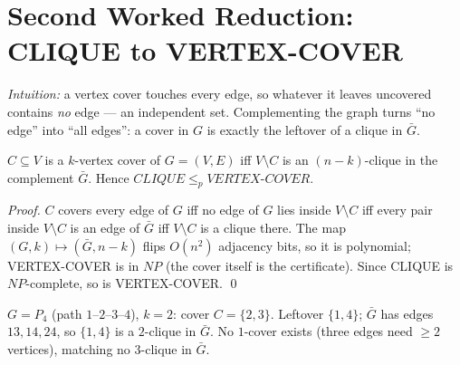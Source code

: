 \section{Second Worked Reduction: CLIQUE to VERTEX-COVER}
\label{sec:vc-reduction}
\emph{Intuition:} a vertex cover touches every edge, so whatever it leaves uncovered contains \emph{no} edge --- an independent set. Complementing the graph turns ``no edge'' into ``all edges'': a cover in $G$ is exactly the leftover of a clique in $\bar G$.
\begin{theorem}
$C\subseteq V$ is a $k$-vertex cover of $G=(V,E)$ iff $V\setminus C$ is an $(n-k)$-clique in the complement $\bar G$. Hence $CLIQUE\le_p VERTEX\text{-}COVER$.
\end{theorem}
\begin{proof}
$C$ covers every edge of $G$ iff no edge of $G$ lies inside $V\setminus C$ iff every pair inside $V\setminus C$ is an edge of $\bar G$ iff $V\setminus C$ is a clique there. The map $(G,k)\mapsto(\bar G,n-k)$ flips $O(n^2)$ adjacency bits, so it is polynomial; VERTEX-COVER is in $NP$ (the cover itself is the certificate). Since CLIQUE is $NP$-complete, so is VERTEX-COVER. \qed
\end{proof}
\begin{example}[Worked] $G=P_4$ (path $1$--$2$--$3$--$4$), $k=2$: cover $C=\{2,3\}$. Leftover $\{1,4\}$; $\bar G$ has edges $13,14,24$, so $\{1,4\}$ is a $2$-clique in $\bar G$. No $1$-cover exists (three edges need $\ge2$ vertices), matching no $3$-clique in $\bar G$.
\end{example}
\begin{center}
\end{center}

